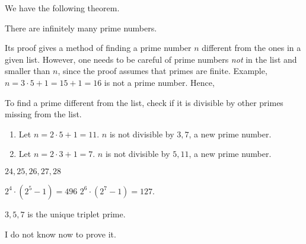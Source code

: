 \begin{exx}
  We have the following theorem.
  \begin{thm}[Theorem 3]
    There are infinitely many prime numbers.
  \end{thm}
  Its proof gives a method of finding a prime number $n$ different from the ones in a given list.
  However, one needs to be careful of prime numbers \emph{not} in the list
  and smaller than $n$, since the proof assumes that primes are finite. Example,
  $n=3\cdot5+1=15+1=16$ is not a prime number. Hence,
  \begin{cd}[Method]
    To find a prime different from the list, check if it is divisible by other primes
    missing from the list.
  \end{cd}
  \begin{enumerate}[label=(\alph*)]
    \item Let $n=2\cdot5+1=11$. $n$ is not divisible by $3,7$, a new prime number.
    \item Let $n=2\cdot3+1=7$. $n$ is not divisible by $5,11$, a new prime number.
  \end{enumerate}
\end{exx}

\begin{exx}
  $24, 25, 26, 27, 28$
\end{exx}

\begin{exx}
  $2^4\cdot(2^5-1)=496$ \newline
  $2^6\cdot(2^7-1)=127$.
\end{exx}

\begin{exx}
  \begin{ab}
    $3,5,7$ is the unique triplet prime.
  \end{ab}
  I do not know now to prove it.
\end{exx}

